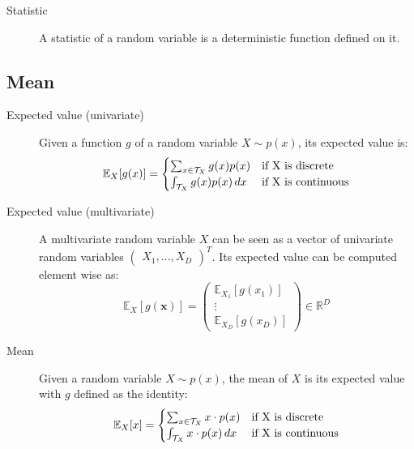 \begin{description}
    \item[Statistic] 
        A statistic of a random variable is a deterministic function defined on it. 
\end{description}


\subsection{Mean}
\begin{description}
    \item[Expected value (univariate)] 
        Given a function $g$ of a random variable $X \sim p(x)$,
        its expected value is:
        \[ 
            \mathbb{E}_X[g(x)] = 
            \begin{cases}
                \sum_{x \in \mathcal{T}_X} g(x)p(x) & \text{if } $X$ \text{ is discrete} \\
                \int_{\mathcal{T}_X} g(x)p(x) \,dx  & \text{if } $X$ \text{ is continuous} \\
            \end{cases}
        \]

    \item[Expected value (multivariate)] 
        A multivariate random variable $X$ can be seen as 
        a vector of univariate random variables $\begin{pmatrix} X_1, \dots, X_D \end{pmatrix}^T$.
        Its expected value can be computed element wise as:
        \[ 
            \mathbb{E}_X[g(\bm{x})] = 
            \begin{pmatrix} \mathbb{E}_{X_1}[g(x_1)] \\ \vdots \\ \mathbb{E}_{X_D}[g(x_D)] \end{pmatrix} \in \mathbb{R}^D
        \]

    \item[Mean] 
        Given a random variable $X \sim p(x)$,
        the mean of $X$ is its expected value with $g$ defined as the identity:
        \[ 
            \mathbb{E}_X[x] = 
            \begin{cases}
                \sum_{x \in \mathcal{T}_X} x \cdot p(x) & \text{if } $X$ \text{ is discrete} \\
                \int_{\mathcal{T}_X} x \cdot p(x) \,dx  & \text{if } $X$ \text{ is continuous} \\
            \end{cases}
        \]
\end{description}


